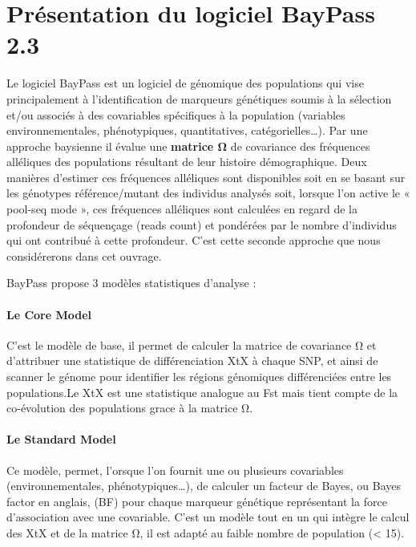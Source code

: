 \documentclass[
  openany]{book}
\begin{document}
\hypertarget{pruxe9sentation-du-logiciel-baypass-2.3}{%
\chapter*{Présentation du logiciel BayPass 2.3}\label{pruxe9sentation-du-logiciel-baypass-2.3}}

Le logiciel BayPass est un logiciel de génomique des populations qui vise principalement à l'identification de marqueurs génétiques soumis à la sélection et/ou associés à des covariables spécifiques à la population (variables environnementales, phénotypiques, quantitatives, catégorielles\ldots). Par une approche baysienne il évalue une \textbf{matrice Ω} de covariance des fréquences alléliques des populations résultant de leur histoire démographique. Deux manières d'estimer ces fréquences alléliques sont disponibles soit en se basant sur les génotypes référence/mutant des individus analysés soit, lorsque l'on active le « pool-seq mode », ces fréquences alléliques sont calculées en regard de la profondeur de séquençage (reads count) et pondérées par le nombre d'individus qui ont contribué à cette profondeur. C'est cette seconde approche que nous considérerons dans cet ouvrage.

BayPass propose 3 modèles statistiques d'analyse :

\hypertarget{le-core-model}{%
\subsubsection*{Le Core Model}\label{le-core-model}}

C'est le modèle de base, il permet de calculer la matrice de covariance Ω et d'attribuer une statistique de différenciation XtX à chaque SNP, et ainsi de scanner le génome pour identifier les régions génomiques différenciées entre les populations.Le XtX est une statistique analogue au Fst mais tient compte de la co-évolution des populations grace à la matrice Ω.

\hypertarget{le-standard-model}{%
\subsubsection*{Le Standard Model}\label{le-standard-model}}

Ce modèle, permet, l'orsque l'on fournit une ou plusieurs covariables (environnementales, phénotypiques\ldots), de calculer un facteur de Bayes, ou Bayes factor en anglais, (BF) pour chaque marqueur génétique représentant la force d'association avec une covariable. C'est un modèle tout en un qui intègre le calcul des XtX et de la matrice Ω, il est adapté au faible nombre de population (\textless{} 15).
\end{document}
